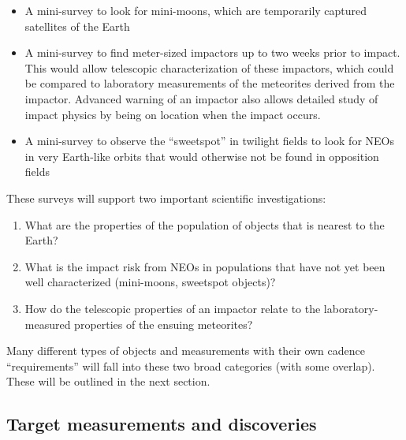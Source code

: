 \begin{itemize}
\item A mini-survey to look for mini-moons, which are temporarily captured
satellites of the Earth
\item A mini-survey to find meter-sized impactors up to two weeks prior to impact.
This would allow telescopic characterization of these impactors, which could
be compared to laboratory measurements of the meteorites derived from
the impactor. Advanced warning of an impactor also allows detailed
study of impact physics by being on location when the impact
occurs.
\item A mini-survey to observe the ``sweetspot'' in twilight fields
to look for NEOs in very Earth-like orbits that would otherwise not
be found in opposition fields
\end{itemize}

These surveys will support two important scientific investigations:
\begin{enumerate}
\item What are the properties of the population of objects that is
nearest to the Earth?
\item What is the impact risk from NEOs in populations that
have not yet been well characterized (mini-moons, sweetspot objects)?
\item How do the telescopic properties of an impactor relate to the
laboratory-measured properties of the ensuing meteorites?
\end{enumerate}

Many different types of objects and measurements with their own cadence ``requirements'' will fall into
these two broad categories (with some overlap).  These will be outlined in the next section.


\subsection{Target measurements and discoveries}
\label{sec:keyword:targets}

%

